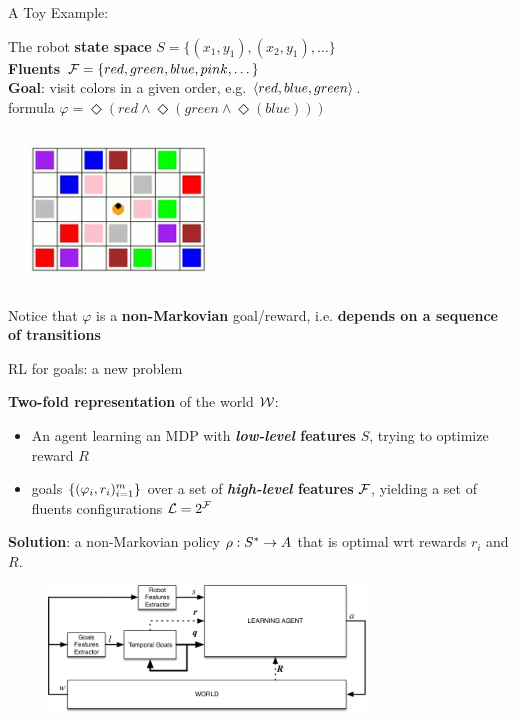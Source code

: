 \documentclass{beamer}
\begin{document}
\begin{frame}{A Toy Example: \Sapientino}
	
	The robot \textbf{state space} $S = \{(x_1, y_1), (x_2, y_1), \dots\}$\\
	\textbf{Fluents} $\mathcal{F} = \{red, green, blue, pink,\dots\}$\\
	\textbf{Goal}: visit colors in a given order, e.g. $\langle red, blue, green \rangle$.\\
	\LTLf formula $\varphi = \Diamond (red \land \Diamond (green \land \Diamond(blue)))$
	\begin{center}
	\includegraphics[width=0.45\textwidth]{images/sapientino-start}
	\end{center}
	
	Notice that $\varphi$ is a \textbf{non-Markovian} goal/reward, i.e. \textbf{depends on a sequence of transitions}
	
\end{frame}



\begin{frame}{RL for \LLf goals: a new problem}
	
	\textbf{Two-fold representation} of the world $\mathcal{W}$:
	\begin{itemize}
		\item An agent learning an MDP with \textbf{\emph{low-level} features} $S$, trying to optimize reward $R$
		\item \LLf goals $\{(\varphi_i, r_i)_{i=1}^m\}$ over a set of \textbf{\emph{high-level} features} $\mathcal{F}$, yielding a set of fluents configurations $\mathcal{L} = 2^{\mathcal{F}}$
	\end{itemize}
	
	\textbf{Solution}: a non-Markovian policy $\rho: S^*\to A$ that is optimal wrt rewards $r_i$ and $R$.
	
	\begin{figure}
		\includegraphics[width=0.75\textwidth]{images/rl-two-representations-no-borders}
	\end{figure}
	
	
\end{frame}
\end{document}
